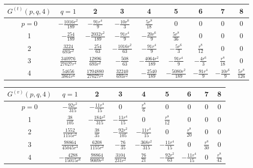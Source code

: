 \documentclass[a4paper,aps,preprint,groupedaddress,showpacs]{revtex4}
\begin{document}
\vspace{40pt}
\begin{tabular}{c|cccccccc}
\hline\hline
$G^{(t)}(p,q,4)$ & $q=1$ & 2 & 3 & 4 & 5 & 6 & 7 & 8 \\
\hline
$p=0$ & $-\frac{1016r^{2}}{189}$ & $-\frac{91r^{4}}{9}$ &
$-\frac{10r^{6}}{3}$ & $\frac{5r^{8}}{18}$ & 0 & 0 & 0 & 0 \\
1 & $-\frac{254}{189}$ & $-\frac{2032r^{2}}{189}$ &
$-\frac{91r^{4}}{9}$ & $-\frac{20r^{6}}{9}$ &
$\frac{5r^{8}}{36}$ & 0 & 0 & 0 \\
2 & $\frac{3224}{693r^{2}}$ & $-\frac{254}{63}$ &
$-\frac{1016r^{2}}{63}$ & $-\frac{91r^{4}}{9}$ &
$-\frac{5r^{6}}{3}$ & $\frac{r^{8}}{12}$ & 0 & 0 \\
3 & $\frac{340976}{27027r^{4}}$ & $\frac{12896}{693r^{2}}$ &
$-\frac{508}{63}$ & $-\frac{4064r^{2}}{189}$ &
$-\frac{91r^{4}}{9}$ & $-\frac{4r^{6}}{3}$ &
$\frac{r^{8}}{18}$ & 0 \\
4 & $\frac{54656}{3861r^{6}}$ & $\frac{1704880}{27027r^{4}}$ &
$\frac{32240}{693r^{2}}$ & $-\frac{2540}{189}$ &
$-\frac{5080r^{2}}{189}$ & $-\frac{91r^{4}}{9}$ &
$-\frac{10r^{6}}{9}$ & $\frac{5r^{8}}{126}$ \\
\hline\hline
\end{tabular}

\vspace{40pt}
\begin{tabular}{c|cccccccc}
\hline\hline
$G^{(v)}(p,q,4)$ & $q=1$ & 2 & 3 & 4 & 5 & 6 & 7 & 8 \\
\hline
$p=0$ & $-\frac{92r^{2}}{315}$ & $-\frac{11r^{4}}{15}$ &
0 & $\frac{r^{8}}{6}$ & 0 & 0 & 0 & 0 \\
1 & $\frac{38}{105}$ & $-\frac{184r^{2}}{315}$ &
$-\frac{11r^{4}}{15}$ & 0 &
$\frac{r^{8}}{12}$ & 0 & 0 & 0 \\
2 & $\frac{1552}{1155r^{2}}$ & $\frac{38}{35}$ &
$-\frac{92r^{2}}{105}$ & $-\frac{11r^{4}}{15}$ &
0 & $\frac{r^{8}}{20}$ & 0 & 0 \\
3 & $\frac{98864}{45045r^{4}}$ & $\frac{6208}{1155r^{2}}$ &
$-\frac{76}{35}$ & $-\frac{368r^{2}}{315}$ &
$-\frac{11r^{4}}{15}$ & 0 &
$\frac{r^{8}}{30}$ & 0 \\
4 & $-\frac{4288}{15015r^{6}}$ & $\frac{98864}{9009r^{4}}$ &
$\frac{3104}{231r^{2}}$ & $\frac{76}{21}$ &
$-\frac{92r^{2}}{63}$ & $-\frac{11r^{4}}{15}$ &
0 & $\frac{r^{8}}{42}$ \\
\hline\hline
\end{tabular}
\end{document}
